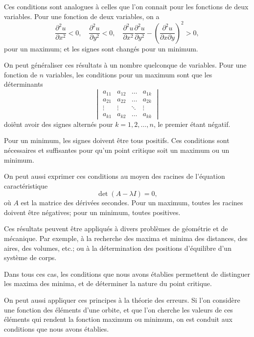 \documentclass[11pt,a4paper]{article}
\begin{document}
Ces conditions sont analogues \`{a} celles que l'on connait pour les fonctions de deux
variables. Pour une fonction de deux variables, on a
\[
\frac{\partial^2 u}{\partial x^2} < 0, \quad \frac{\partial^2 u}{\partial y^2} < 0, \quad \frac{\partial^2 u}{\partial x^2} \frac{\partial^2 u}{\partial y^2} - \left(\frac{\partial^2 u}{\partial x \partial y}\right)^2 > 0,
\]
pour un maximum; et les signes sont chang\'{e}s pour un minimum.

\newpage
\setcounter{page}{232}

On peut g\'{e}n\'{e}raliser ces r\'{e}sultats \`{a} un nombre quelconque de variables. Pour une
fonction de $n$ variables, les conditions pour un maximum sont que les d\'{e}terminants
\[
\begin{vmatrix}
a_{11} & a_{12} & \ldots & a_{1k} \\
a_{21} & a_{22} & \ldots & a_{2k} \\
\vdots & \vdots & \ddots & \vdots \\
a_{k1} & a_{k2} & \ldots & a_{kk}
\end{vmatrix}
\]
doi\^{e}nt avoir des signes altern\'{e}s pour $k=1, 2, \ldots, n$, le premier \'{e}tant n\'{e}gatif.

\newpage
\setcounter{page}{233}

Pour un minimum, les signes doivent \^{e}tre tous positifs. Ces conditions sont
n\'{e}cessaires et suffisantes pour qu'un point critique soit un maximum ou un minimum.

On peut aussi exprimer ces conditions au moyen des racines de l'\'{e}quation caract\'{e}ristique
\[
\det(A - \lambda I) = 0,
\]
o\`{u} $A$ est la matrice des d\'{e}riv\'{e}es secondes. Pour un maximum, toutes les racines doivent
\^{e}tre n\'{e}gatives; pour un minimum, toutes positives.

\newpage
\setcounter{page}{234}

Ces r\'{e}sultats peuvent \^{e}tre appliqu\'{e}s \`{a} divers probl\`{e}mes de g\'{e}om\'{e}trie et de m\'{e}canique.
Par exemple, \`{a} la recherche des maxima et minima des distances, des aires, des
volumes, etc.; ou \`{a} la d\'{e}termination des positions d'\'{e}quilibre d'un syst\`{e}me de corps.

Dans tous ces cas, les conditions que nous avons \'{e}tablies permettent de distinguer
les maxima des minima, et de d\'{e}terminer la nature du point critique.

\newpage
\setcounter{page}{235}

On peut aussi appliquer ces principes \`{a} la th\'{e}orie des erreurs. Si l'on consid\`{e}re
une fonction des \'{e}l\'{e}ments d'une orbite, et que l'on cherche les valeurs de ces \'{e}l\'{e}ments
qui rendent la fonction maximum ou minimum, on est conduit aux conditions que
nous avons \'{e}tablies.
\end{document}
